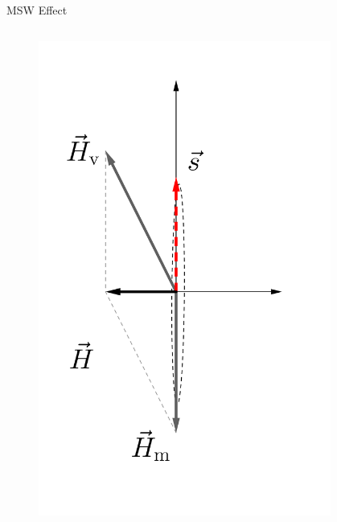 \documentclass[9pt]{beamer}
\begin{document}
\begin{darkframes}
\begin{frame}{MSW Effect}
{\begin{columns}[T]
\begin{column}{0.33\textwidth}
\end{column}
\end{columns}

}

 {


\begin{columns}[T]
\begin{column}{0.5\textwidth}



\begin{figure}
    \centering
    \colorbox{white}{\includegraphics[width=0.9\textwidth]{assets/matter-effect-critical-density}}
\end{figure}


\end{column}%
\begin{column}{0.5\textwidth}




\end{column}
\end{columns}}
\end{frame}
\end{darkframes}
\end{document}
